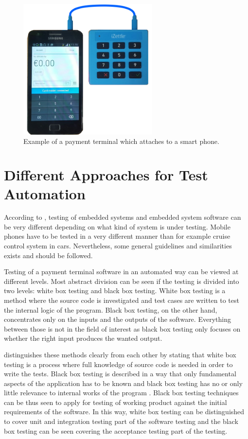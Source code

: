 \begin{figure}[ht]
  \begin{center}
    \includegraphics[width=7cm]{images/izettle.png}
    \caption{Example of a payment terminal which attaches to a smart phone.}
    \label{fig:izettle}
  \end{center}
\end{figure}

\section{Different Approaches for Test Automation}
\label{section:test automation approaches}

According to \cite{broekman2003testing}, testing of embedded systems and embedded system software can be very different depending on what kind of system is under testing. Mobile phones have to be tested in a very different manner than for example cruise control system in cars. Nevertheless, some general guidelines and similarities exists and should be followed.

Testing of a payment terminal software in an automated way can be viewed at different levels. Most abstract division can be seen if the testing is divided into two levels: white box testing and black box testing. White box testing is a method where the source code is investigated and test cases are written to test the internal logic of the program. Black box testing, on the other hand, concentrates only on the inputs and the outputs of the software. Everything between those is not in the field of interest as black box testing only focuses on whether the right input produces the wanted output. \citep{myers2011art}

\cite{khan2012comparative} distinguishes these methods clearly from each other by stating that white box testing is a process where full knowledge of source code is needed in order to write the tests. Black box testing is described in a way that only fundamental aspects of the application has to be known and black box testing has no or only little relevance to internal works of the program \citep{pressman2005software}. Black box testing techniques can be thus seen to apply for testing of working product against the initial requirements of the software. In this way, white box testing can be distinguished to cover unit and integration testing part of the software testing and the black box testing can be seen covering the acceptance testing part of the testing.

